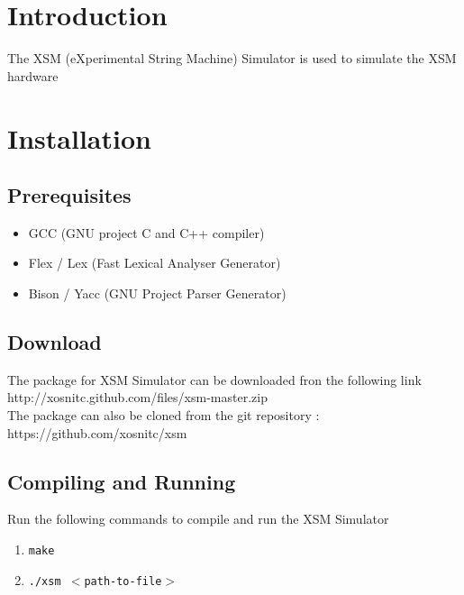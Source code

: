 \documentclass[11pt]{report}
\begin{document}
\section{Introduction}
The XSM (eXperimental String Machine)  Simulator is used to simulate the XSM hardware

\section{Installation}

\subsection{Prerequisites}
\begin{itemize}
	\item GCC  (GNU project C and C++ compiler)
	\item Flex / Lex  (Fast Lexical Analyser Generator)
	\item Bison / Yacc  (GNU Project Parser Generator)
\end{itemize} 

\subsection{Download}
The package for XSM Simulator can be downloaded fron the following link\\ 
http://xosnitc.github.com/files/xsm-master.zip\\
The package can also be cloned from the git repository : \\
https://github.com/xosnitc/xsm

\subsection{Compiling and Running}
Run the following commands to compile and run the XSM Simulator
\begin{enumerate}
		\item \texttt{make}
		\item \texttt{./xsm $<$path-to-file$>$ }
\end{enumerate}
\end{document}
